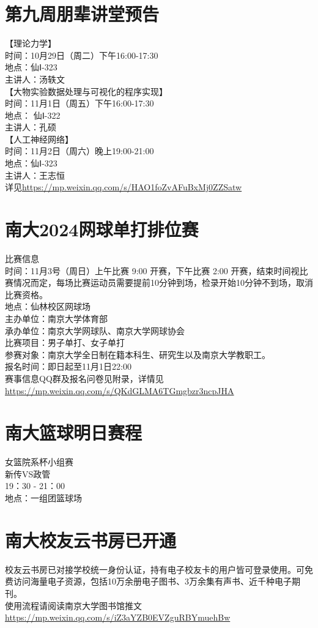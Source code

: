 \documentclass[letterpaper, 12pt]{article}
\begin{document}
\begin{multicols}{2}
\section{第九周朋辈讲堂预告}
【理论力学】\\
时间：10月29日（周二）下午16:00-17:30\\
地点：仙Ⅰ-323\\
主讲人：汤轶文 \\
【大物实验数据处理与可视化的程序实现】\\
时间：11月1日（周五）下午16:00-17:30\\
地点： 仙Ⅰ-322\\
主讲人：孔硕 \\
【人工神经网络】\\
时间：11月2日（周六）晚上19:00-21:00\\
地点：仙Ⅰ-323\\
主讲人：王志恒\\
详见\url{https://mp.weixin.qq.com/s/HAO1foZvAFuBxMj0ZZSatw}\\
\section{南大2024网球单打排位赛}
比赛信息\\
时间：11月3号（周日）上午比赛 9:00 开赛，下午比赛 2:00 开赛，结束时间视比赛情况而定，每场比赛运动员需要提前10分钟到场，检录开始10分钟不到场，取消比赛资格。\\
地点：仙林校区网球场\\
主办单位：南京大学体育部\\
承办单位：南京大学网球队、南京大学网球协会\\
比赛项目：男子单打、女子单打\\
参赛对象：南京大学全日制在籍本科生、研究生以及南京大学教职工。\\
报名时间：即日起至11月1日22:00\\
赛事信息QQ群及报名问卷见附录，详情见\url{https://mp.weixin.qq.com/s/QKdGLMA6TGmgbzr3ncpJHA}\\
\section{南大篮球明日赛程}
女篮院系杯小组赛\\
新传VS政管\\
19：30 - 21：00\\
地点：一组团篮球场\\
\section{南大校友云书房已开通}
校友云书房已对接学校统一身份认证，持有电子校友卡的用户皆可登录使用。可免费访问海量电子资源，包括10万余册电子图书、3万余集有声书、近千种电子期刊。\\
使用流程请阅读南京大学图书馆推文\url{https://mp.weixin.qq.com/s/iZ3aYZB0EVZguRBYmuehBw}\\



\end{multicols}
\end{document}
